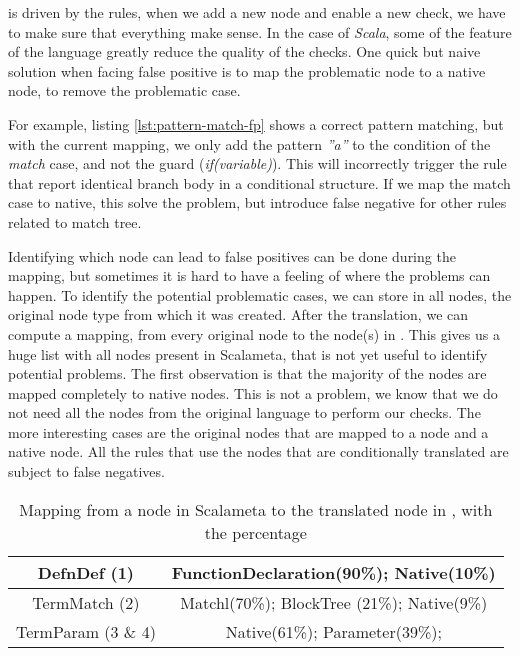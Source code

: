 \slang{} is driven by the rules, when we add a new node and enable a new check, we have to make sure that everything make sense. 
In the case of \emph{Scala}, some of the feature of the language greatly reduce the quality of the checks.
One quick but naive solution when facing false positive is to map the problematic node to a native node, to remove the problematic case.



For example, listing \ref{lst:pattern-match-fp} shows a correct pattern matching, but with the current mapping, we only add the pattern \emph{”a”} to the condition of the \emph{match} case, and not the guard (\emph{if(variable)}). 
This will incorrectly trigger the rule that report identical branch body in a conditional structure. 
If we map the match case to native, this solve the problem, but introduce false negative for other rules related to match tree.

Identifying which node can lead to false positives can be done during the mapping, but sometimes it is hard to have a feeling of where the problems can happen. 
To identify the potential problematic cases, we can store in all nodes, the original node type from which it was created. 
After the translation, we can compute a mapping, from every original node to the node(s) in \slang{}. 
This gives us a huge list with all nodes present in Scalameta, that is not yet useful to identify potential problems. 
The first observation is that the majority of the nodes are mapped completely to native nodes. 
This is not a problem, we know that we do not need all the nodes from the original language to perform our checks.
The more interesting cases are the original nodes that are mapped to a \slang{} node and a native node. 
All the rules that use the nodes that are conditionally translated are subject to false negatives.

\begin{table}[h]
	\centering
	\caption{Mapping from a node in Scalameta to the translated node in \slang{}, with the percentage}
	\label{table:interesting_mapping}
	\begin{tabular}{|c|c|}
		\hline
		DefnDef (1) &  FunctionDeclaration(90\%); Native(10\%) \\ \hline
		TermMatch (2) &  Matchl(70\%); BlockTree (21\%); Native(9\%) \\ \hline
		TermParam (3 \& 4) & Native(61\%); Parameter(39\%); \\ \hline
	\end{tabular}
\end{table}

